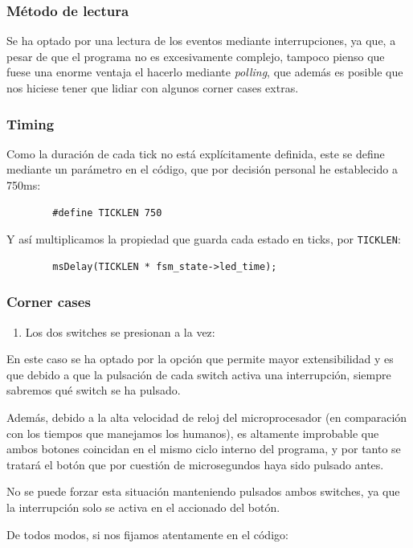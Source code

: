 \documentclass[a4paper,openright,12pt]{article}
\begin{document}
\subsubsection{Método de lectura}\label{reading_method}
Se ha optado por una lectura de los eventos mediante interrupciones, ya que, a pesar de que el programa no es excesivamente complejo, tampoco pienso que fuese una enorme ventaja el
hacerlo mediante \emph{polling}, que además es posible que nos hiciese tener que lidiar con algunos corner cases extras.

\subsubsection{Timing}\label{ticklen_duration}
Como la duración de cada tick no está explícitamente definida, este se define mediante un parámetro en el código, que por decisión personal
he establecido a 750ms:
\begin{verbatim}
        #define TICKLEN 750
\end{verbatim}

Y así multiplicamos la propiedad que guarda cada estado en ticks, por \texttt{TICKLEN}:
\begin{verbatim}
        msDelay(TICKLEN * fsm_state->led_time);
\end{verbatim}

\subsubsection{Corner cases}
\begin{enumerate}
    \item Los dos switches se presionan a la vez:
\end{enumerate}
En este caso se ha optado por la opción que permite mayor extensibilidad y es que debido a que la pulsación de cada switch activa una interrupción,
siempre sabremos qué switch se ha pulsado.

Además, debido a la alta velocidad de reloj del microprocesador (en comparación con los tiempos que manejamos los humanos), es altamente improbable que ambos botones coincidan
en el mismo ciclo interno del programa, y por tanto se tratará el botón que por cuestión de microsegundos haya sido pulsado antes.

No se puede forzar esta situación manteniendo pulsados ambos switches, ya que la interrupción solo se activa en el accionado del botón.

De todos modos, si nos fijamos atentamente en el código:
\end{document}
